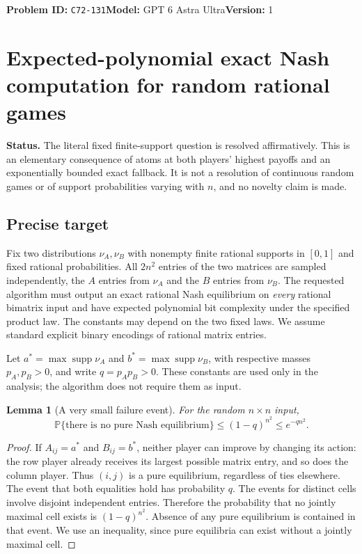 \documentclass[11pt,a4paper]{article}
\newtheorem{lemma}[theorem]{Lemma}
\newcommand{\Prb}{\mathbb P}
\newcommand{\supp}{\operatorname{supp}}
\begin{document}
\noindent\textbf{Problem ID:} \texttt{C72-131}\quad\textbf{Model:} GPT 6 Astra Ultra\quad\textbf{Version:} 1\par
\section*{Expected-polynomial exact Nash computation for random rational games}

\textbf{Status.} The literal fixed finite-support question is resolved affirmatively. This is an elementary consequence of atoms at both players' highest payoffs and an exponentially bounded exact fallback. It is not a resolution of continuous random games or of support probabilities varying with $n$, and no novelty claim is made.

\subsection*{Precise target}
Fix two distributions $\nu_A,\nu_B$ with nonempty finite rational supports in $[0,1]$ and fixed rational probabilities. All $2n^2$ entries of the two matrices are sampled independently, the $A$ entries from $\nu_A$ and the $B$ entries from $\nu_B$. The requested algorithm must output an exact rational Nash equilibrium on \emph{every} rational bimatrix input and have expected polynomial bit complexity under the specified product law. The constants may depend on the two fixed laws. We assume standard explicit binary encodings of rational matrix entries.

Let $a^*=\max\supp\nu_A$ and $b^*=\max\supp\nu_B$, with respective masses $p_A,p_B>0$, and write $q=p_Ap_B>0$. These constants are used only in the analysis; the algorithm does not require them as input.

\begin{lemma}[A very small failure event]
For the random $n\times n$ input,
\[
 \Prb\{\text{there is no pure Nash equilibrium}\}
 \leq(1-q)^{n^2}\leq e^{-qn^2}.
\]
\end{lemma}
\begin{proof}
If $A_{ij}=a^*$ and $B_{ij}=b^*$, neither player can improve by changing its action: the row player already receives its largest possible matrix entry, and so does the column player. Thus $(i,j)$ is a pure equilibrium, regardless of ties elsewhere. The event that both equalities hold has probability $q$. The events for distinct cells involve disjoint independent entries. Therefore the probability that no jointly maximal cell exists is $(1-q)^{n^2}$. Absence of any pure equilibrium is contained in that event. We use an inequality, since pure equilibria can exist without a jointly maximal cell.
\end{proof}
\end{document}
